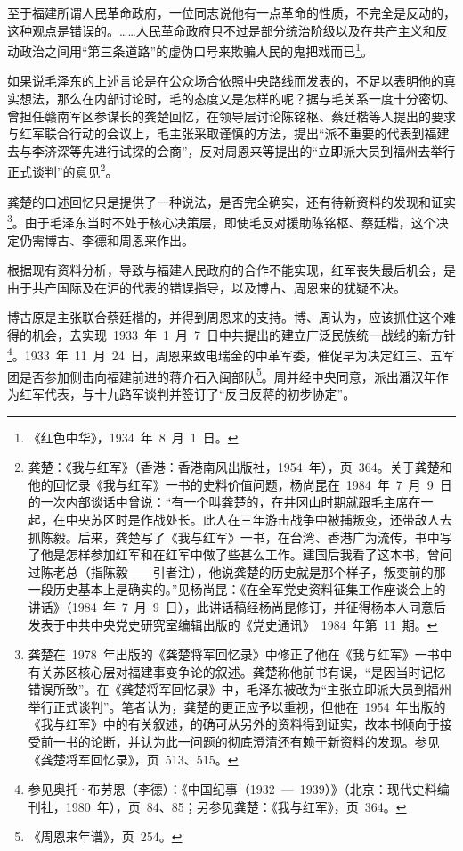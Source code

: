 \begin{quoting}
至于福建所谓人民革命政府，一位同志说他有一点革命的性质，不完全是反动的，这种观点是错误的。……人民革命政府只不过是部分统治阶级以及在共产主义和反动政治之间用“第三条道路”的虚伪口号来欺骗人民的鬼把戏而已\footnote{《红色中华》，1934~年~8~月~1~日。}。
\end{quoting}

如果说毛泽东的上述言论是在公众场合依照中央路线而发表的，不足以表明他的真实想法，那么在内部讨论时，毛的态度又是怎样的呢？据与毛关系一度十分密切、曾担任赣南军区参谋长的龚楚回忆，在领导层讨论陈铭枢、蔡廷楷等人提出的要求与红军联合行动的会议上，毛主张采取谨慎的方法，提出“派不重要的代表到福建去与李济深等先进行试探的会商”，反对周恩来等提出的“立即派大员到福州去举行正式谈判”的意见\footnote{龚楚：《我与红军》（香港：香港南风出版社，1954~年），页~364。关于龚楚和他的回忆录《我与红军》一书的史料价值问题，杨尚昆在~1984~年~7~月~9~日的一次内部谈话中曾说：“有一个叫龚楚的，在井冈山时期就跟毛主席在一起，在中央苏区时是作战处长。此人在三年游击战争中被捕叛变，还带敌人去抓陈毅。后来，龚楚写了《我与红军》一书，在台湾、香港广为流传，书中写了他是怎样参加红军和在红军中做了些甚么工作。建国后我看了这本书，曾问过陈老总（指陈毅——引者注），他说龚楚的历史就是那个样子，叛变前的那一段历史基本上是确实的。”见杨尚昆：《在全军党史资料征集工作座谈会上的讲话》（1984~年~7~月~9~日），此讲话稿经杨尚昆修订，并征得杨本人同意后发表于中共中央党史研究室编辑出版的《党史通讯》~1984~年第~11~期。}。

龚楚的口述回忆只是提供了一种说法，是否完全确实，还有待新资料的发现和证实\footnote{龚楚在~1978~年出版的《龚楚将军回忆录》中修正了他在《我与红军》一书中有关苏区核心层对福建事变争论的叙述。龚楚称他前书有误，“是因当时记忆错误所致”。在《龚楚将军回忆录》中，毛泽东被改为“主张立即派大员到福州举行正式谈判”。笔者认为，龚楚的更正应予以重视，但他在~1954~年出版的《我与红军》中的有关叙述，的确可从另外的资料得到证实，故本书倾向于接受前一书的论断，并认为此一问题的彻底澄清还有赖于新资料的发现。参见《龚楚将军回忆录》，页~513、515。}。由于毛泽东当时不处于核心决策层，即使毛反对援助陈铭枢、蔡廷楷，这个决定仍需博古、李德和周恩来作出。

根据现有资料分析，导致与福建人民政府的合作不能实现，红军丧失最后机会，是由于共产国际及在沪的代表的错误指导，以及博古、周恩来的犹疑不决。

博古原是主张联合蔡廷楷的，并得到周恩来的支持。博、周认为，应该抓住这个难得的机会，去实现~1933~年~1~月~7~日中共提出的建立广泛民族统一战线的新方针\footnote{参见奥托·布劳恩（李德）：《中国纪事（1932~—~1939）》（北京：现代史料编刊社，1980~年），页~84、85；另参见龚楚：《我与红军》，页~364。}。1933~年~11~月~24~日，周恩来致电瑞金的中革军委，催促早为决定红三、五军团是否参加侧击向福建前进的蒋介石入闽部队\footnote{《周恩来年谱》，页~254。}。周并经中央同意，派出潘汉年作为红军代表，与十九路军谈判并签订了“反日反蒋的初步协定”。

